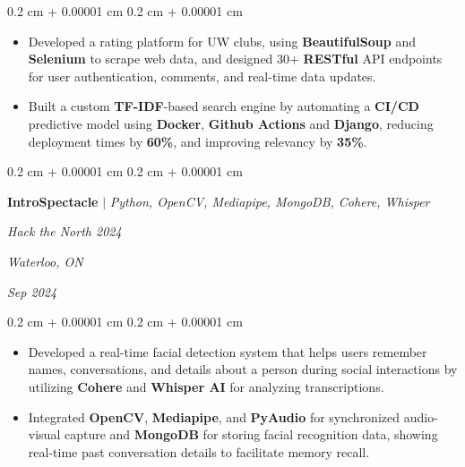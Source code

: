 \documentclass[10pt, letterpaper]{article}
\newenvironment{highlights}{
    \begin{itemize}[
        topsep=0.10 cm,
        parsep=0.10 cm,
        partopsep=0pt,
        itemsep=0pt,
        leftmargin=0.4 cm + 10pt
    ]
}{
    \end{itemize}
} %
\newenvironment{onecolentry}{
    \begin{adjustwidth}{
        0.2 cm + 0.00001 cm
    }{
        0.2 cm + 0.00001 cm
    }
}{
    \end{adjustwidth}
} %
\newenvironment{twocolentry}[2][]{
    \onecolentry
    \def\secondColumn{#2}
    \setcolumnwidth{\fill, 4.5 cm}
    \begin{paracol}{2}
}{
    \switchcolumn \raggedleft \secondColumn
    \end{paracol}
    \endonecolentry
} %
\let\hrefWithoutArrow\href
\renewcommand{\href}[2]{\hrefWithoutArrow{#1}{\ifthenelse{\equal{#2}{}}{ }{#2 }\raisebox{.15ex}{\footnotesize \faExternalLink*}}}
\begin{document}
        \vspace{0.10 cm}
        \begin{onecolentry}
            \begin{highlights}
                \item Developed a rating platform for UW clubs, using \textbf{BeautifulSoup} and \textbf{Selenium} to scrape web data, and designed 30+ \textbf{RESTful} API endpoints for user authentication, comments, and real-time data updates.
                \item Built a custom \textbf{TF-IDF}-based search engine by automating a \textbf{CI/CD} predictive model using \textbf{Docker}, \textbf{Github Actions} and \textbf{Django}, reducing deployment times by \textbf{60\%}, and improving relevancy by \textbf{35\%}.
                
            \end{highlights}
        \end{onecolentry}

        \vspace{0.2 cm}

       \begin{twocolentry}{
         \textit{Waterloo, ON}    
            
        \textit{Sep 2024}}
            \textbf{\textbf{IntroSpectacle }}\mbox{\hrefWithoutArrow{https://github.com/vinny-nguyen/IntroSpectacle}{\color{black}{\footnotesize\faGithub}}}
            $|$ \emph{Python, OpenCV, Mediapipe, MongoDB, Cohere, Whisper}
            
            \textit{Hack the North 2024}
        \end{twocolentry}
        
        \vspace{0.10 cm}
        \begin{onecolentry}
            \begin{highlights}
                \item Developed a real-time facial detection system that helps users remember names, conversations, and details about a person during social interactions by utilizing \textbf{Cohere} and \textbf{Whisper AI} for analyzing transcriptions.
                \item Integrated \textbf{OpenCV}, \textbf{Mediapipe}, and \textbf{PyAudio} for synchronized audio-visual capture and \textbf{MongoDB} for storing facial
recognition data, showing real-time past conversation details to facilitate memory recall.
            \end{highlights}
        \end{onecolentry}
\end{document}
